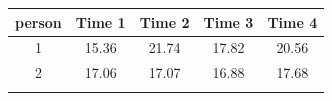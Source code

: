 \documentclass[]{article}
\theoremstyle{definition}
\theoremstyle{definition}
\theoremstyle{definition}
\theoremstyle{remark}
\begin{document}
\begin{longtable}[]{@{}ccccc@{}}
\toprule
\begin{minipage}[b]{0.11\columnwidth}\centering\strut
person\strut
\end{minipage} & \begin{minipage}[b]{0.11\columnwidth}\centering\strut
Time 1\strut
\end{minipage} & \begin{minipage}[b]{0.11\columnwidth}\centering\strut
Time 2\strut
\end{minipage} & \begin{minipage}[b]{0.11\columnwidth}\centering\strut
Time 3\strut
\end{minipage} & \begin{minipage}[b]{0.11\columnwidth}\centering\strut
Time 4\strut
\end{minipage}\tabularnewline
\midrule
\endhead
\begin{minipage}[t]{0.11\columnwidth}\centering\strut
1\strut
\end{minipage} & \begin{minipage}[t]{0.11\columnwidth}\centering\strut
15.36\strut
\end{minipage} & \begin{minipage}[t]{0.11\columnwidth}\centering\strut
21.74\strut
\end{minipage} & \begin{minipage}[t]{0.11\columnwidth}\centering\strut
17.82\strut
\end{minipage} & \begin{minipage}[t]{0.11\columnwidth}\centering\strut
20.56\strut
\end{minipage}\tabularnewline
\begin{minipage}[t]{0.11\columnwidth}\centering\strut
2\strut
\end{minipage} & \begin{minipage}[t]{0.11\columnwidth}\centering\strut
17.06\strut
\end{minipage} & \begin{minipage}[t]{0.11\columnwidth}\centering\strut
17.07\strut
\end{minipage} & \begin{minipage}[t]{0.11\columnwidth}\centering\strut
16.88\strut
\end{minipage} & \begin{minipage}[t]{0.11\columnwidth}\centering\strut
17.68\strut
\end{minipage}\tabularnewline
\begin{minipage}[t]{0.11\columnwidth}\centering\strut

\end{minipage}
\end{longtable}
\end{document}
